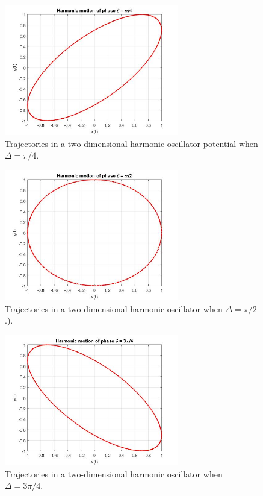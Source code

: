  \begin{figure}[hbt!]
	\centering
	\begin{framed}
	\includegraphics[width=0.68\textwidth]{Figures/p4.jpg}
		\end{framed}
	\caption{ Trajectories in a two-dimensional harmonic oscillator potential when $\Delta = \pi/4 $. }
	\label{fig:O2}
\end{figure}

\newpage

 \begin{figure}[hbt!]
	\centering
	\begin{framed}
	\includegraphics[width=0.68\textwidth]{Figures/p2.jpg}
		\end{framed}
	\caption{ Trajectories in a two-dimensional harmonic oscillator  when $\Delta = \pi/2 $.). }
	\label{fig:03}
\end{figure}


 \begin{figure}[hbt!]
	\centering
	\begin{framed}
	\includegraphics[width=0.68\textwidth]{Figures/3p.jpg}
	\end{framed}
	\caption{ Trajectories in a two-dimensional harmonic oscillator  when $\Delta = 3\pi/4 $. }
	\label{fig:04}
\end{figure}

